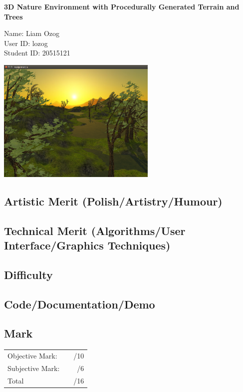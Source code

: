 \documentclass{article}
\newcommand\projecttitle{3D Nature Environment with Procedurally Generated Terrain and Trees}
\newcommand\myname{Liam Ozog}
\newcommand\myuserid{lozog}
\newcommand\mystudentid{20515121}
\begin{document}
\begin{minipage}[t]{3in}
{\huge \bf 
	\projecttitle 
}

\medskip
Name: \myname \\ 
User ID: \myuserid \\ 
Student ID: \mystudentid 
\end{minipage}
\hfill
\begin{minipage}[t]{3in}
\vspace{0pt}
\includegraphics[width=3in]{screenshot.png}   %
\end{minipage}


\subsection*{Artistic Merit (Polish/Artistry/Humour)}
\vfill
\subsection*{Technical Merit (Algorithms/User Interface/Graphics Techniques)}
\vfill
\subsection*{Difficulty}
\vfill
\subsection*{Code/Documentation/Demo}
\vfill
\subsection*{Mark}
\begin{center}
\begin{tabular}{lr}
Objective Mark: &~~/10\\
Subjective Mark: &~~/6\\
\hline
Total &~~/16
\end{tabular}
\end{center}
\end{document}

